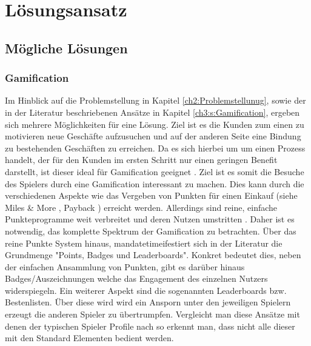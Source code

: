 \chapter{Lösungsansatz}
\label{sec:S4_Lösungsansatz}

\section{Mögliche Lösungen}

\subsection*{Gamification}

Im Hinblick auf die Problemstellung in Kapitel \ref{ch2:Problemstellunug}, sowie der in der Literatur beschriebenen Ansätze in Kapitel \ref{ch3:s:Gamification}, ergeben sich mehrere Möglichkeiten für eine Lösung. Ziel ist es die Kunden zum einen zu motivieren neue Geschäfte aufzusuchen und auf der anderen Seite eine Bindung zu bestehenden Geschäften zu erreichen. Da es sich hierbei um um einen Prozess handelt, der für den Kunden im ersten Schritt nur einen geringen Benefit darstellt, ist dieser ideal für Gamification geeignet \cite{Leigh.2012}. Ziel ist es somit die Besuche des Spielers durch eine Gamification interessant zu machen. Dies kann durch die verschiedenen Aspekte wie das Vergeben von Punkten für einen Einkauf (siehe Miles \& More \cite{Wagner.2005}, Payback \cite{Roesl.2005}) erreicht werden. Allerdings sind reine, einfache Punkteprogramme weit verbreitet und deren Nutzen umstritten \cite{Schmitt.2001}.
Daher ist es notwendig, das komplette Spektrum der Gamification zu betrachten.
Über das reine Punkte System hinaus, mandatetimeifestiert sich in der Literatur die Grundmenge "Points, Badges und Leaderboards".
Konkret bedeutet dies, neben der einfachen Ansammlung von Punkten, gibt es darüber hinaus Badges/Auszeichnungen welche das Engagement des einzelnen Nutzers widerspiegeln. Ein weiterer Aspekt sind die sogenannten Leaderboards bzw. Bestenlisten. Über diese wird wird ein Ansporn unter den jeweiligen Spielern erzeugt die anderen Spieler zu übertrumpfen. Vergleicht man diese Ansätze mit denen der typischen Spieler Profile nach \citep{Bartle.2004} so erkennt man, dass nicht alle dieser mit den Standard Elementen bedient werden.


